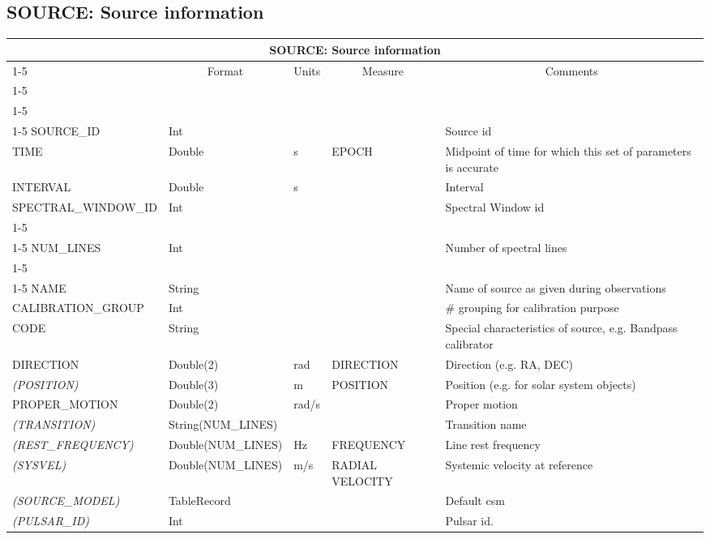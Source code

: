 \documentclass{article}
\newcommand{\defline}[1]{\cline{1-5}
\multicolumn{5}{|l|}{#1} \\
\cline{1-5}}
\newcommand{\definetable}[2]
{
	\vfill\newpage
	\subsection{#1}
        \vspace{0.15in}
        \small
	\begin{tabular}{|l|p{1.25in}|l|p{.9in}|p{1.4in}|}
	\hline
	\multicolumn{5}{|c|}{\bf #1}\\ 
	\cline{1-5}
        \multicolumn{1}{|c|}{Name}&\multicolumn{1}{|c|}{Format}&
        \multicolumn{1}{|c|}{Units}&\multicolumn{1}{|c|}{Measure}&
        \multicolumn{1}{|c|}{Comments}\\
        \cline{1-5}
        #2
        \hline
	\end{tabular}
}
\begin{document}
\definetable{SOURCE: Source information}{
\defline{\bf Columns}
\defline{\em Key}
SOURCE\_ID &      Int &    &      & Source id\\
TIME &   Double & s  &   EPOCH  & Midpoint of time for which this set of parameters is accurate\\
INTERVAL &       Double & s &               & Interval\\
SPECTRAL\_WINDOW\_ID &   Int &    &      & Spectral Window id\\
\defline{\em Data description}
NUM\_LINES &  Int & & & Number of spectral lines\\
\defline{\em Data}  
NAME &       String &    &      & Name of source as given during observations\\
CALIBRATION\_GROUP &      Int &    &      & \# grouping for calibration purpose\\
CODE &       String &    &      & Special characteristics of source, e.g. Bandpass calibrator\\
DIRECTION &       Double(2) &  rad  &    DIRECTION &        Direction (e.g. RA, DEC) \\
{\it (POSITION)}  & Double(3) &   m  & POSITION & Position (e.g. for solar system objects) \\
PROPER\_MOTION &  Double(2) &  rad/s & &  Proper motion \\
{\it (TRANSITION)} & String(NUM\_LINES) & & & Transition name\\
{\it (REST\_FREQUENCY)} & Double(NUM\_LINES) & Hz & FREQUENCY & Line rest frequency\\
{\it (SYSVEL)}   & Double(NUM\_LINES)  &  m/s  & RADIAL VELOCITY & Systemic velocity at reference \\
{\it (SOURCE\_MODEL)} & TableRecord & & & Default csm \\
{\it (PULSAR\_ID)} & Int & & & Pulsar id. \\
}
\end{document}
